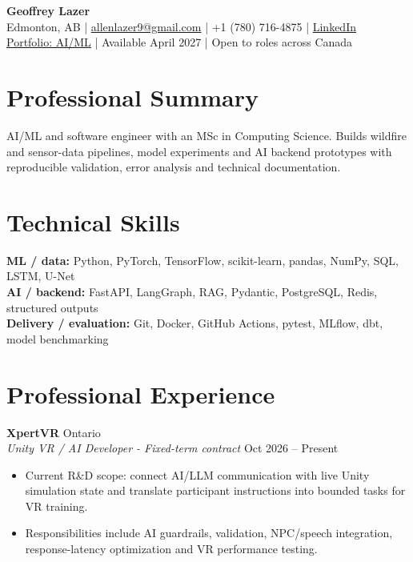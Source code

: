 \documentclass[10pt]{article}
\begin{document}
\begin{center}
    {\Large \textbf{Geoffrey Lazer}}\\[-2pt]
    Edmonton, AB
    \;|\;
    \href{mailto:allenlazer9@gmail.com}{allenlazer9@gmail.com}
    \;|\;
    +1 (780) 716-4875
    \;|\;
    \href{https://linkedin.com/in/geoffrey-lazer-09b0901b2}{LinkedIn}\\[-2pt]
    \href{https://geoff-portfolio-github-io.vercel.app/ai-ml/}{Portfolio: AI/ML} \;|\; Available April 2027 \;|\; Open to roles across Canada
\end{center}

\section{Professional Summary}

AI/ML and software engineer with an MSc in Computing Science. Builds wildfire and sensor-data pipelines, model experiments and AI backend prototypes with reproducible validation, error analysis and technical documentation.

\section{Technical Skills}

{\small
\textbf{ML / data:} Python, PyTorch, TensorFlow, scikit-learn, pandas, NumPy, SQL, LSTM, U-Net\\[-1pt]
\textbf{AI / backend:} FastAPI, LangGraph, RAG, Pydantic, PostgreSQL, Redis, structured outputs\\[-1pt]
\textbf{Delivery / evaluation:} Git, Docker, GitHub Actions, pytest, MLflow, dbt, model benchmarking
}

\section{Professional Experience}

\textbf{XpertVR}
\hfill Ontario\\
\textit{Unity VR / AI Developer - Fixed-term contract}
\hfill Oct 2026 -- Present

\begin{itemize}
    \item Current R\&D scope: connect AI/LLM communication with live Unity simulation state and translate participant instructions into bounded tasks for VR training.
    \item Responsibilities include AI guardrails, validation, NPC/speech integration, response-latency optimization and VR performance testing.
\end{itemize}
\end{document}
